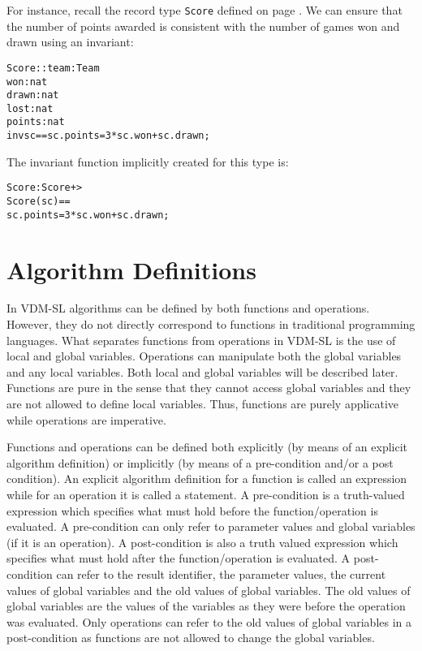 \documentclass[\pformat,12pt]{article}
\newcommand{\vdmslpp}[2]{%
#1
}
\newcommand{\vdmsl}{VDM-SL}
\newcommand{\vdmpp}{VDM++}
\begin{document}
For instance, recall the record type \texttt{Score} defined on page
\pageref{scoredef}. We can ensure that the number of points awarded
is consistent with the number of games won and drawn using an invariant:
\begin{alltt}
  Score :: team : Team
           won : nat
           drawn : nat
           lost : nat
           points : nat
  inv sc == sc.points = 3 * sc.won + sc.drawn;
\end{alltt}
The invariant function implicitly created for this type is:
\begin{alltt}
  Score : Score +> 
  Score (sc) == 
    sc.points = 3 * sc.won + sc.drawn;
\end{alltt}

\section{Algorithm Definitions}
\label{algorithm}


In \vdmslpp{\vdmsl}{\vdmpp} algorithms can be defined by both
functions and operations.  However, they do not directly correspond to
functions in traditional programming languages. What separates
functions from operations in \vdmslpp{\vdmsl}{\vdmpp} is the use of
local and global variables. Operations can manipulate both the global
variables and any local variables.  Both
local and global variables will be described later. Functions are pure in
the sense that they cannot access global variables and they are not
allowed to define local variables. Thus, functions are purely
applicative while operations are imperative.

Functions and operations can be defined both explicitly (by means of
an explicit algorithm definition) or implicitly (by means of a
pre-condition and/or a post condition).  An explicit algorithm
definition for a function is called an expression while for an
operation it is called a statement.  A pre-condition is a truth-valued
expression which specifies what must hold before the
function/operation is evaluated. A pre-condition can only refer to
parameter values and global variables (if it is an operation).  A
post-condition is also a truth valued expression which specifies what
must hold after the function/operation is evaluated. A post-condition
can refer to the result identifier, the parameter values, the current
values of global variables and the old values of global variables. The
old values of global variables are the values of the variables as they
were before the operation was evaluated.  Only operations can refer to
the old values of global variables in a post-condition as functions
are not allowed to change the global variables.
\end{document}
